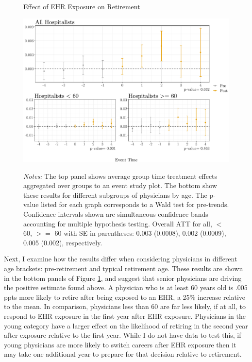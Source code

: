 \documentclass[11pt]{article}
\begin{document}
\begin{figure}[ht]
    \centering
    \caption{Effect of EHR Exposure on Retirement}
    \includegraphics[scale=.65]{Objects/retire_plot.pdf}
    \label{fig:retirefirst}
    \vspace{2mm}
    \caption*{\footnotesize{\textit{Notes:} The top panel shows average group time treatment effects aggregated over groups to an event study plot. The bottom show these results for different subgroups of physicians by age. The p-value listed for each graph corresponds to a Wald test for pre-trends. Confidence intervals shown are simultaneous confidence bands accounting for multiple hypothesis testing. Overall ATT for all, $<$ 60, $>=$ 60 with SE in parentheses: 0.003 (0.0008), 0.002 (0.0009), 0.005 (0.002), respectively.}}
\end{figure}


Next, I examine how the results differ when considering physicians in different age brackets: pre-retirement and typical retirement age. These results are shown in the bottom panels of Figure \ref{fig:retirefirst}, and suggest that senior physicians are driving the positive estimate found above. A physician who is at least 60 years old is .005 ppts more likely to retire after being exposed to an EHR, a 25\% increase relative to the mean. In comparison, physicians less than 60 are far less likely, if at all, to respond to EHR exposure in the first year after EHR exposure. Physicians in the young category have a larger effect on the likelihood of retiring in the second year after exposure relative to the first year. While I do not have data to test this, if young physicians are more likely to switch careers after EHR exposure then it may take one additional year to prepare for that decision relative to retirement.   
\end{document}
